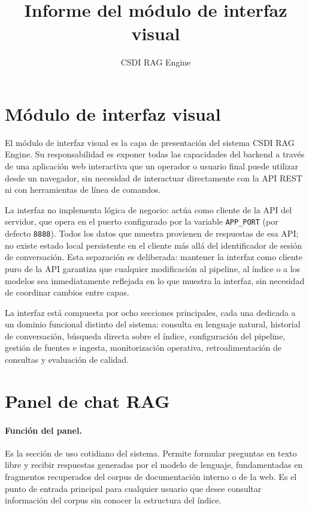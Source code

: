\documentclass[11pt]{article}
\title{Informe del módulo de interfaz visual}
\author{CSDI RAG Engine}
\date{}
\begin{document}
\maketitle

\section{Módulo de interfaz visual}

El módulo de interfaz visual es la capa de presentación del sistema CSDI RAG Engine. Su
responsabilidad es exponer todas las capacidades del backend a través de una aplicación web
interactiva que un operador o usuario final puede utilizar desde un navegador, sin necesidad
de interactuar directamente con la API REST ni con herramientas de línea de comandos.

La interfaz no implementa lógica de negocio: actúa como cliente de la API del servidor, que
opera en el puerto configurado por la variable \texttt{APP\_PORT} (por defecto \texttt{8888}).
Todos los datos que muestra provienen de respuestas de esa API; no existe estado local
persistente en el cliente más allá del identificador de sesión de conversación. Esta separación
es deliberada: mantener la interfaz como cliente puro de la API garantiza que cualquier
modificación al pipeline, al índice o a los modelos sea inmediatamente reflejada en lo que
muestra la interfaz, sin necesidad de coordinar cambios entre capas.

La interfaz está compuesta por ocho secciones principales, cada una dedicada a un dominio
funcional distinto del sistema: consulta en lenguaje natural, historial de conversación,
búsqueda directa sobre el índice, configuración del pipeline, gestión de fuentes e ingesta,
monitorización operativa, retroalimentación de consultas y evaluación de calidad.

\section{Panel de chat RAG}

\paragraph{Función del panel.}
Es la sección de uso cotidiano del sistema. Permite formular preguntas en texto libre y recibir
respuestas generadas por el modelo de lenguaje, fundamentadas en fragmentos recuperados del
corpus de documentación interno o de la web. Es el punto de entrada principal para cualquier
usuario que desee consultar información del corpus sin conocer la estructura del índice.
\end{document}
